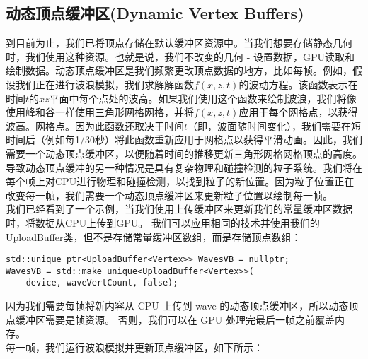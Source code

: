 \subsection{动态顶点缓冲区(Dynamic Vertex Buffers)}
\begin{flushleft}
到目前为止，我们已将顶点存储在默认缓冲区资源中。当我们想要存储静态几何时，我们使用这种资源。也就是说，我们不改变的几何 - 设置数据，GPU读取和绘制数据。动态顶点缓冲区是我们频繁更改顶点数据的地方，比如每帧。例如，假设我们正在进行波浪模拟，我们求解解函数$f(x,z,t)$的波动方程。该函数表示在时间$t$的$xz$平面中每个点处的波高。如果我们使用这个函数来绘制波浪，我们将像使用峰和谷一样使用三角形网格网格，并将$f(x,z,t)$应用于每个网格点，以获得波高。网格点。因为此函数还取决于时间$t$（即，波面随时间变化），我们需要在短时间后（例如每1/30秒）将此函数重新应用于网格点以获得平滑动画。因此，我们需要一个动态顶点缓冲区，以便随着时间的推移更新三角形网格网格顶点的高度。导致动态顶点缓冲的另一种情况是具有复杂物理和碰撞检测的粒子系统。我们将在每个帧上对CPU进行物理和碰撞检测，以找到粒子的新位置。因为粒子位置正在改变每一帧，我们需要一个动态顶点缓冲区来更新粒子位置以绘制每一帧。\\

我们已经看到了一个示例，当我们使用上传缓冲区来更新我们的常量缓冲区数据时，将数据从CPU上传到GPU。 我们可以应用相同的技术并使用我们的UploadBuffer类，但不是存储常量缓冲区数组，而是存储顶点数组：\\
\end{flushleft}

\begin{lstlisting}
std::unique_ptr<UploadBuffer<Vertex>> WavesVB = nullptr;
WavesVB = std::make_unique<UploadBuffer<Vertex>>(
    device, waveVertCount, false);
\end{lstlisting}

\begin{flushleft}
因为我们需要每帧将新内容从 CPU 上传到 wave 的动态顶点缓冲区，所以动态顶点缓冲区需要是帧资源。 否则，我们可以在 GPU 处理完最后一帧之前覆盖内存。\\
每一帧，我们运行波浪模拟并更新顶点缓冲区，如下所示：\\
\end{flushleft}

